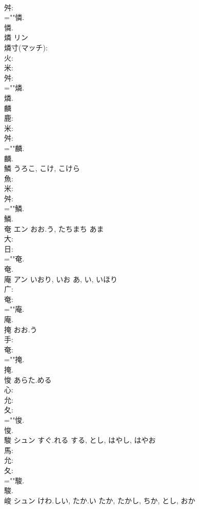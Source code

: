 \documentclass[8pt]{extreport}
\begin{document}
\begin{CJK}{UTF8}{min}
\\	舛: 
\\	=""憐.
\\	憐.
\\	燐	リン			
\\	燐寸(マッチ): 
\\	火: 
\\	米: 
\\	舛: 
\\	=""燐.
\\	燐.
\\	麟						
\\	鹿: 
\\	米: 
\\	舛: 
\\	=""麟.
\\	麟.
\\	鱗		うろこ, こけ, こけら				
\\	魚: 
\\	米: 
\\	舛: 
\\	=""鱗.
\\	鱗.
\\	奄	エン	おお.う, たちまち	あま	
\\	大: 
\\	日: 
\\	=""奄.
\\	奄.
\\	庵	アン	いおり, いお	あ, い, いほり	
\\	广: 
\\	奄: 
\\	=""庵.
\\	庵.
\\	掩		おお.う				
\\	手: 
\\	奄: 
\\	=""掩.
\\	掩.
\\	悛		あらた.める				
\\	心: 
\\	允: 
\\	夂: 
\\	=""悛.
\\	悛.
\\	駿	シュン	すぐ.れる	する, とし, はやし, はやお	
\\	馬: 
\\	允: 
\\	夂: 
\\	=""駿.
\\	駿.
\\	峻	シュン	けわ.しい, たか.い	たか, たかし, ちか, とし, おか	

\end{CJK}
\end{document}
